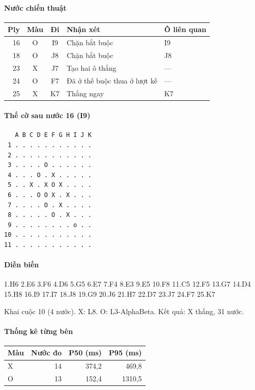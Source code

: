 \paragraph{Nước chiến thuật}
\begin{center}\small
\begin{tabular}{@{}rccll@{}}
\toprule
Ply & Màu & Đi & Nhận xét & Ô liên quan \\
\midrule
16 & O & I9 & Chặn bắt buộc & I9 \\
18 & O & J8 & Chặn bắt buộc & J8 \\
23 & X & J7 & Tạo hai ô thắng & — \\
24 & O & F7 & Đã ở thế buộc thua ở lượt kế & — \\
25 & X & K7 & Thắng ngay & K7 \\
\bottomrule
\end{tabular}
\end{center}
\paragraph{Thế cờ sau nước 16 (I9)}
\begin{verbatim}
   A B C D E F G H I J K
 1 . . . . . . . . . . .
 2 . . . . . . . . . . .
 3 . . . . O . . . . . .
 4 . . . O . X . . . . .
 5 . . X . X O X . . . .
 6 . . . O O X . X . . .
 7 . . . . O . X . . . .
 8 . . . . . O . X . . .
 9 . . . . . . . . o . .
10 . . . . . . . . . . .
11 . . . . . . . . . . .
\end{verbatim}
\paragraph{Diễn biến}
{\footnotesize 1.H6 2.E6 3.F6 4.D6 5.G5 6.E7 7.F4 8.E3 9.E5 10.F8 11.C5 12.F5 13.G7 14.D4 15.H8 16.I9 17.I7 18.J8 19.G9 20.J6 21.H7 22.D7 23.J7 24.F7 25.K7\par}
Khai cuộc 10 (4 nước). X: L8. O: L3-AlphaBeta. Kết quả: X thắng, 31 nước.
\paragraph{Thống kê từng bên}
\begin{center}\small
\begin{tabular}{@{}lrrr@{}}
\toprule
Màu & Nước đo & P50 (ms) & P95 (ms) \\
\midrule
X & 14 & 374,2 & 469,8 \\
O & 13 & 152,4 & 1310,5 \\
\bottomrule
\end{tabular}
\end{center}
